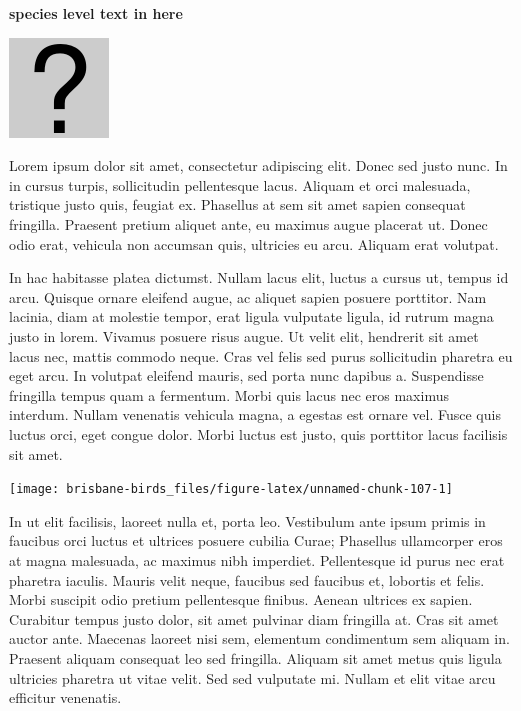 \documentclass[]{book}
\let\origfigure\figure
\let\endorigfigure\endfigure
\renewenvironment{figure}[1][2] {
  \expandafter\origfigure\expandafter[H]
} {
  \endorigfigure
}
\begin{document}
\textbf{species level text in here}

\begin{figure}
\centering
\includegraphics{assets/missing.png}
\caption{No image for species}
\end{figure}

Lorem ipsum dolor sit amet, consectetur adipiscing elit. Donec sed justo
nunc. In in cursus turpis, sollicitudin pellentesque lacus. Aliquam et
orci malesuada, tristique justo quis, feugiat ex. Phasellus at sem sit
amet sapien consequat fringilla. Praesent pretium aliquet ante, eu
maximus augue placerat ut. Donec odio erat, vehicula non accumsan quis,
ultricies eu arcu. Aliquam erat volutpat.

In hac habitasse platea dictumst. Nullam lacus elit, luctus a cursus ut,
tempus id arcu. Quisque ornare eleifend augue, ac aliquet sapien posuere
porttitor. Nam lacinia, diam at molestie tempor, erat ligula vulputate
ligula, id rutrum magna justo in lorem. Vivamus posuere risus augue. Ut
velit elit, hendrerit sit amet lacus nec, mattis commodo neque. Cras vel
felis sed purus sollicitudin pharetra eu eget arcu. In volutpat eleifend
mauris, sed porta nunc dapibus a. Suspendisse fringilla tempus quam a
fermentum. Morbi quis lacus nec eros maximus interdum. Nullam venenatis
vehicula magna, a egestas est ornare vel. Fusce quis luctus orci, eget
congue dolor. Morbi luctus est justo, quis porttitor lacus facilisis sit
amet.

\begin{figure}
\texttt{[image: brisbane-birds\_files/figure-latex/unnamed-chunk-107-1]} \caption{insert figure caption}\label{fig:unnamed-chunk-107}
\end{figure}

In ut elit facilisis, laoreet nulla et, porta leo. Vestibulum ante ipsum
primis in faucibus orci luctus et ultrices posuere cubilia Curae;
Phasellus ullamcorper eros at magna malesuada, ac maximus nibh
imperdiet. Pellentesque id purus nec erat pharetra iaculis. Mauris velit
neque, faucibus sed faucibus et, lobortis et felis. Morbi suscipit odio
pretium pellentesque finibus. Aenean ultrices ex sapien. Curabitur
tempus justo dolor, sit amet pulvinar diam fringilla at. Cras sit amet
auctor ante. Maecenas laoreet nisi sem, elementum condimentum sem
aliquam in. Praesent aliquam consequat leo sed fringilla. Aliquam sit
amet metus quis ligula ultricies pharetra ut vitae velit. Sed sed
vulputate mi. Nullam et elit vitae arcu efficitur venenatis.
\end{document}
